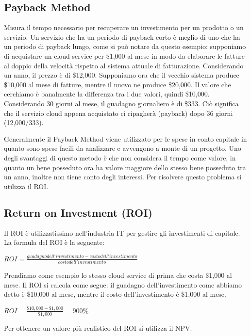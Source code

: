 \subsection{Payback Method}
Misura il tempo necessario per recuperare un investimento per un prodotto o un servizio. Un servizio che ha un periodo di payback corto è meglio di uno che ha un periodo di payback lungo, come si può notare da questo esempio: supponiamo di acquistare un cloud service per \$1,000 al mese in modo da elaborare le fatture al doppio della velocità rispetto al sistema attuale di fatturazione. Considerando un anno, il prezzo è di \$12,000. Supponiamo ora che il vecchio sistema produce \$10,000 al mese di fatture, mentre il nuovo ne produce \$20,000. Il valore che cerchiamo è banalmente la differenza tra i due valori, quindi \$10,000. Considerando 30 giorni al mese, il guadagno giornaliero è di \$333. Ciò significa che il servizio cloud appena acquistato ci ripagherà (payback) dopo 36 giorni (12,000/333).

\vspace{5mm}

Generalmente il Payback Method viene utilizzato per le spese in conto capitale in quanto sono spese facili da analizzare e avvengono a monte di un progetto. Uno degli svantaggi di questo metodo è che non considera il tempo come valore, in quanto un bene posseduto ora ha valore maggiore dello stesso bene posseduto tra un anno, inoltre non tiene conto degli interessi. Per risolvere questo problema si utilizza il ROI.

\subsection{Return on Investment (ROI)}
Il ROI è utilizzatissimo nell'industria IT per gestire gli investimenti di capitale. La formula del ROI è la seguente:

\begin{center}
    $ROI = \frac{guadagno dell'investimento - costo dell'investimento}{costo dell'investimento}$
\end{center}

Prendiamo come esempio lo stesso cloud service di prima che costa \$1,000 al mese. Il ROI si calcola come segue: il guadagno dell'investimento come abbiamo detto è \$10,000 al mese, mentre il costo dell'investimento è \$1,000 al mese.
\begin{center}
    $ROI = \frac{\$10,000 - \$1,000}{\$1,000} = 900\%$
\end{center}
Per ottenere un valore più realistico del ROI si utilizza il NPV.

